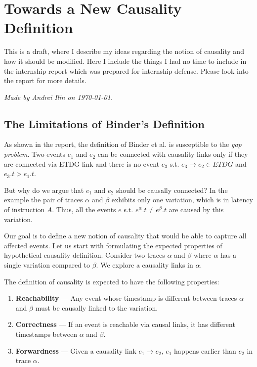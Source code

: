 \documentclass[12pt, a4paper]{memoir} %
\newcommand{\TODO}[1]{}
\newcounter{example}
\begin{document}
\chapter*{Towards a New Causality Definition}

This is a draft, where I describe my ideas regarding the notion of causality and how it should be modified. Here I include the things I had no time to include in the internship report which was prepared for internship defense. Please look into the report for more details.

\TODO{add abstract}

\textit{Made by Andrei Ilin on \today.}

\section{The Limitations of Binder's Definition}

As shown in the report, the definition of Binder et al. is susceptible to the \textit{gap problem}. Two events $e_1$ and $e_2$ can be connected with causality links only if they are connected via ETDG link and there is no event $e_3$ s.t. $e_3 \rightarrow e_2 \in ETDG$ and $e_3.t > e_1.t$. 

But why do we argue that $e_1$ and $e_2$ should be causally connected? In the example the pair of traces $\alpha$ and $\beta$ exhibits only one variation, which is in latency of instruction $A$. Thus, all the events $e$ s.t. $e^\alpha.t \ne e^\beta.t$ are caused by this variation.

Our goal is to define a new notion of causality that would be able to capture all affected events. Let us start with formulating the expected properties of hypothetical causality definition. Consider two traces $\alpha$ and $\beta$ where $\alpha$ has a single variation compared to $\beta$. We explore a causality links in $\alpha$.

The definition of causality is expected to have the following properties:
\begin{enumerate}
    \item \textbf{Reachability} --- Any event whose timestamp is different between traces $\alpha$ and $\beta$ must be causally linked to the variation.
    \item \textbf{Correctness} --- If an event is reachable via causal links, it has different timestamps between $\alpha$ and $\beta$.
    \item \textbf{Forwardness} --- Given a causality link $e_1 \rightarrow e_2$, $e_1$ happens earlier than $e_2$ in trace $\alpha$.
\end{enumerate}
\end{document}
